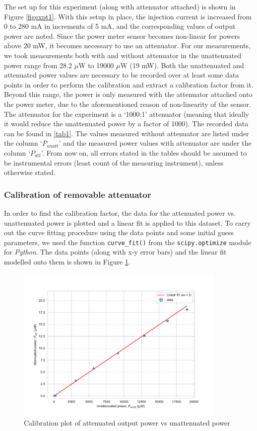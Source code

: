 The set up for this experiment (along with attenuator attached) is shown in Figure \ref{figexpt1}. With this setup in place, the injection current is increased from 0 to 280 mA in increments of 5 mA, and the corresponding values of output power are noted. Since the power meter sensor becomes non-linear for powers above 20 mW, it becomes necessary to use an attenuator. For our measurements, we took measurements both with and without attenuator in the unattenuated power range from 28.2 $\mu$W to 19000 $\mu$W (19 mW). Both the unattenuated and attenuated power values are necessary to be recorded over at least some data points in order to perform the calibration and extract a calibration factor from it. Beyond this range, the power is only measured with the attenuator attached onto the power meter, due to the aforementioned reason of non-linearity of the sensor. The attenuator for the experiment is a `1000:1' attenuator (meaning that ideally it would reduce the unattenuated power by a factor of 1000). The recorded data can be found in \ref{tab1}. The values measured without attenuator are listed under the column `$P_{unatt}$' and the measured power values with attenuator are under the column `$P_{att}$'. From now on, all errors stated in the tables should be assumed to be instrumental errors (least count of the measuring instrument), unless otherwise stated.

\subsubsection{Calibration of removable attenuator}
In order to find the calibration factor, the data for the attenuated power vs. unattenuated power is plotted and a linear fit is applied to this dataset. To carry out the curve fitting procedure using the data points and some initial guess parameters, we used the function \texttt{curve\_fit()} from the \texttt{scipy.optimize} module for \textit{Python}. The data points (along with x-y error bars) and the linear fit modelled onto them is shown in Figure \ref{figexpt2}.

\begin{figure}[H]
\includegraphics[width=0.9\textwidth]{./imagesandplots/attvsunattcalib.pdf}
\centering
\caption{Calibration plot of attenuated output power vs unattenuated power}
\label{figexpt2}
\end{figure}


